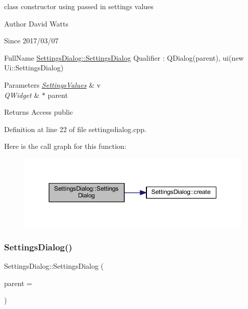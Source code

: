 class constructor using passed in settings values

\begin{DoxyAuthor}{Author}
David Watts 
\end{DoxyAuthor}
\begin{DoxySince}{Since}
2017/03/07
\end{DoxySince}
Full\+Name \hyperlink{class_settings_dialog_a76b0a61383133b8f723431c0b663bdc1}{Settings\+Dialog\+::\+Settings\+Dialog} Qualifier \+: Q\+Dialog(parent), ui(new Ui\+::\+Settings\+Dialog) 
\begin{DoxyParams}{Parameters}
{\em \hyperlink{struct_settings_values}{Settings\+Values}} & v \\
\hline
{\em Q\+Widget} & $\ast$ parent \\
\hline
\end{DoxyParams}
\begin{DoxyReturn}{Returns}
Access public 
\end{DoxyReturn}


Definition at line 22 of file settingsdialog.\+cpp.

Here is the call graph for this function\+:
\nopagebreak
\begin{figure}[H]
\begin{center}
\leavevmode
\includegraphics[width=350pt]{class_settings_dialog_a76b0a61383133b8f723431c0b663bdc1_cgraph}
\end{center}
\end{figure}
\mbox{\label{class_settings_dialog_a9933956b777b2c0451e9119581cc22fb}} 
\subsubsection{\texorpdfstring{Settings\+Dialog()}{SettingsDialog()}\hspace{0.1cm}{\footnotesize\ttfamily [2/2]}}
{\footnotesize\ttfamily Settings\+Dialog\+::\+Settings\+Dialog (\begin{DoxyParamCaption}\item[{Q\+Widget $\ast$}]{parent = {} }\end{DoxyParamCaption})\hspace{0.3cm}{\ttfamily [explicit]}}

